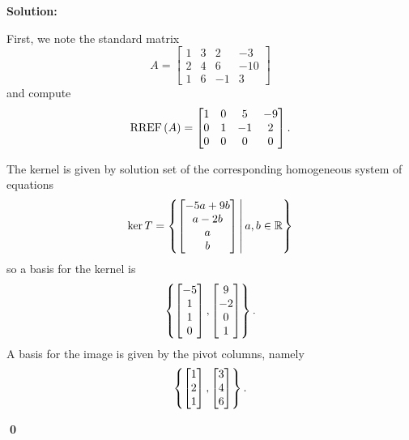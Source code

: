 \documentclass{article}
\newenvironment{solution}
{
  \ignorespaces
  \textbf{Solution:}
}
{
  \ignorespacesafterend
  \begin{flushright}
  {\bfseries \qed}
  \end{flushright}
}
\begin{document}
\begin{solution}
First, we note the standard matrix
\[A=\begin{bmatrix}1 & 3 & 2 & -3 \\ 2 & 4 & 6 & -10 \\ 1 & 6 & -1 & 3 \end{bmatrix}\]
and compute
\[\operatorname{RREF}\left(A\right) = \begin{bmatrix} 1 & 0 & 5 & -9 \\ 0 & 1 & -1 & 2 \\ 0 & 0 & 0 & 0\end{bmatrix}.\]

The kernel is given by solution set of the corresponding homogeneous system of equations
\[ \ker T = \left\{\begin{bmatrix}-5a+9b \\ a-2b \\ a \\ b \end{bmatrix}\,\middle|\,a,b \in \mathbb{R}\right\} \]
so a basis for the kernel is
\[\left\{\begin{bmatrix}-5 \\ 1 \\ 1 \\ 0 \end{bmatrix},
\begin{bmatrix}9 \\ -2 \\ 0 \\ 1 \end{bmatrix}\right\}.\]
A basis for the image is given by the pivot columns, namely
\[\left\{\begin{bmatrix}1\\2\\1 \end{bmatrix},
\begin{bmatrix}3\\4\\6 \end{bmatrix}\right\}.\]
\end{solution}
\end{document}
